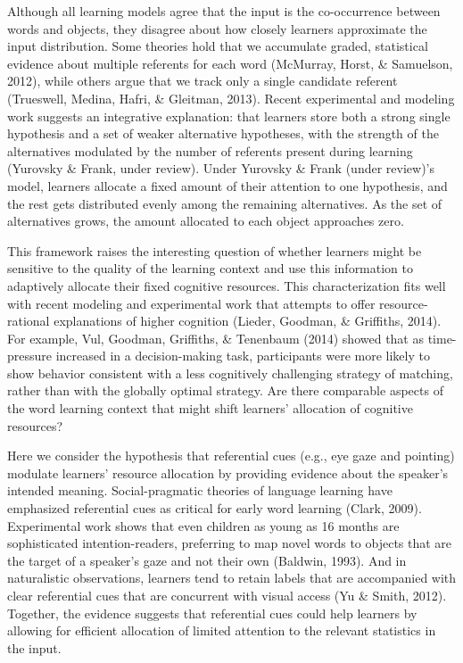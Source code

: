 \documentclass[12pt,]{article}
\begin{document}
Although all learning models agree that the input is the co-occurrence
between words and objects, they disagree about how closely learners
approximate the input distribution. Some theories hold that we
accumulate graded, statistical evidence about multiple referents for
each word (McMurray, Horst, \& Samuelson, 2012), while others argue that
we track only a single candidate referent (Trueswell, Medina, Hafri, \&
Gleitman, 2013). Recent experimental and modeling work suggests an
integrative explanation: that learners store both a strong single
hypothesis and a set of weaker alternative hypotheses, with the strength
of the alternatives modulated by the number of referents present during
learning (Yurovsky \& Frank, under review). Under Yurovsky \& Frank
(under review)'s model, learners allocate a fixed amount of their
attention to one hypothesis, and the rest gets distributed evenly among
the remaining alternatives. As the set of alternatives grows, the amount
allocated to each object approaches zero.

This framework raises the interesting question of whether learners might
be sensitive to the quality of the learning context and use this
information to adaptively allocate their fixed cognitive resources. This
characterization fits well with recent modeling and experimental work
that attempts to offer resource-rational explanations of higher
cognition (Lieder, Goodman, \& Griffiths, 2014). For example, Vul,
Goodman, Griffiths, \& Tenenbaum (2014) showed that as time-pressure
increased in a decision-making task, participants were more likely to
show behavior consistent with a less cognitively challenging strategy of
matching, rather than with the globally optimal strategy. Are there
comparable aspects of the word learning context that might shift
learners' allocation of cognitive resources?

Here we consider the hypothesis that referential cues (e.g., eye gaze
and pointing) modulate learners' resource allocation by providing
evidence about the speaker's intended meaning. Social-pragmatic theories
of language learning have emphasized referential cues as critical for
early word learning (Clark, 2009). Experimental work shows that even
children as young as 16 months are sophisticated intention-readers,
preferring to map novel words to objects that are the target of a
speaker's gaze and not their own (Baldwin, 1993). And in naturalistic
observations, learners tend to retain labels that are accompanied with
clear referential cues that are concurrent with visual access (Yu \&
Smith, 2012). Together, the evidence suggests that referential cues
could help learners by allowing for efficient allocation of limited
attention to the relevant statistics in the input.
\end{document}
